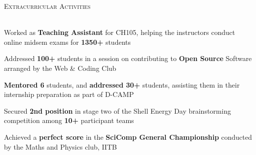\documentclass[10pt]{article}
\renewcommand{\section}[1]{
    \vspace*{3pt}
    \textsc{\Large{#1}}
    \vspace*{-8pt} \\ \hspace*{-5pt} 
    \hrulefill \\
    \vspace*{-15pt}
    \vspace*{-5pt}
}
\newcommand{\smallbullet}{
    \small$\bullet$
}
\newenvironment{bullet-list-major}{
    \vspace*{6pt}
    \begin{list}{
        \smallbullet
    }{
        \setlength\leftmargin{15pt}\topsep -5pt \itemsep -6pt
    }
} {
    \end{list}
}
\begin{document}

    \section{Extracurricular Activities}

    \begin{bullet-list-major}
        \item Worked as \textbf{Teaching Assistant} for CH105, helping the instructors conduct online midsem exams for \textbf{1350+} students
        \item Addressed \textbf{100+} students in a session on contributing to \textbf{Open Source} Software arranged by the Web \& Coding Club
        \item \textbf{Mentored 6} students, and \textbf{addressed 30+} students, assisting them in their internship preparation as part of D-CAMP
        \item Secured \textbf{2nd position} in stage two of the Shell Energy Day brainstorming competition among \textbf{10+} participant teams
        \item Achieved a \textbf{perfect score} in the \textbf{SciComp General Championship} conducted by the Maths and Physics club, IITB
    \end{bullet-list-major}


    \vspace*{-7.71mm}
\end{document}
